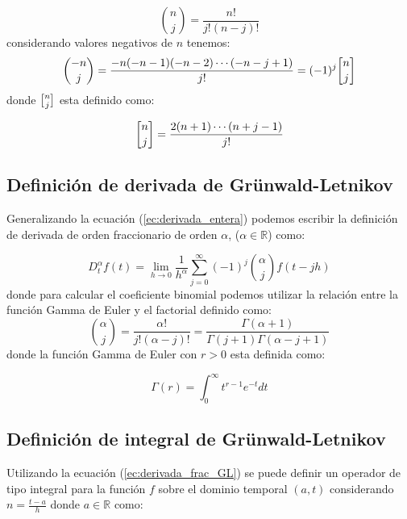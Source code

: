 	\begin{equation}
		\binom{n}{j} = \frac{n!}{j! (n-j)! } 
	\end{equation}
	considerando valores negativos de $n$ tenemos:
	\begin{equation}
		\binom{-n}{j} = \frac{-n(-n-1)(-n-2) \cdots (-n -j +1 )}{j!}= (-1)^{j} \binomb{n}{j}
		\label{ec:binomio_n}
	\end{equation}
	donde $\binomb{n}{j}$ esta definido como:
			
	\begin{equation}
		\binomb{n}{j} = \frac{2(n+1) \cdots (n+j-1)}{j!}
	\end{equation}
	
		\subsection{Definición de derivada de Grünwald-Letnikov}
		
	Generalizando la ecuación (\ref{ec:derivada_entera}) podemos escribir la definición de derivada de orden fraccionario de orden  $\alpha$, ($\alpha \in \mathbb{R}$) como:
		
	\begin{equation}
		D^{\alpha}_{t} f(t) = \lim_{h \to 0} \frac{1}{h^{\alpha}}   \sum_{j = 0}^{\infty} (-1)^{j} \binom{\alpha}{j} f(t - jh)
		\label{ec:derivada_frac_GL}
	\end{equation}
	donde para calcular el coeficiente binomial podemos utilizar la relación entre la función Gamma de Euler y el factorial definido como:
	\begin{equation}
		\binom{\alpha}{j}  = \frac{\alpha!}{j! (\alpha-j)!} = \frac{\Gamma (\alpha + 1)}{\Gamma(j+1) \Gamma(\alpha - j + 1)}
	\end{equation}
	donde la función Gamma de Euler con $r>0$ esta definida como:
			
	\begin{equation}
		\Gamma(r) = \int^{\infty}_{0} t^{r-1} e^{-t}dt
	\end{equation}
			
		\subsection{Definición de integral de Grünwald-Letnikov}
		
	Utilizando la ecuación (\ref{ec:derivada_frac_GL}) se puede definir un operador de tipo integral para la función $f$  sobre el dominio temporal $(a,t)$ considerando $n = \frac{t-a}{h}$ donde $a \in \mathbb{R}$ como:
			
